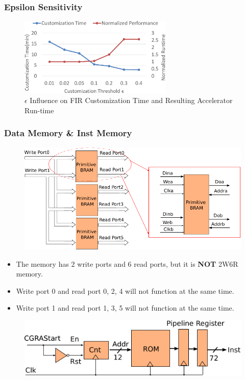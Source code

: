 \documentclass[accentcolor=tud1a,colorbacktitle,inverttitle,landscape,german,presentation,t]{tudbeamer}
\begin{document}
    \begin{frame}
  \frametitle{Epsilon Sensitivity}
  \begin{figure}[htb]
    \centering
    \includegraphics[width=0.65\textwidth]{epsilon-sensitivity}
    \vspace{-0.6em}
    \caption{$\epsilon$ Influence on FIR Customization Time and Resulting Accelerator Run-time}
    \label{fig:epsilon-sensitivity}
  \end{figure}
  \end{frame}

  \begin{frame}
  \frametitle{Data Memory \& Inst Memory}
  \vspace{-0.9em}
  \begin{figure}
    \includegraphics[width=.7\linewidth]{data-mem}
  \end{figure}
  \begin{itemize}
  \item The memory has 2 write ports and 6 read ports, but it is \textbf{NOT} 2W6R memory. \\
  \item Write port 0 and read port 0, 2, 4 will not function at the same time. \\
  \item Write port 1 and read port 1, 3, 5 will not function at the same time.
  \end{itemize}
  \begin{figure}
    \includegraphics[width=.6\linewidth]{inst-rom}
  \end{figure}
  \end{frame}
  
\end{document}
